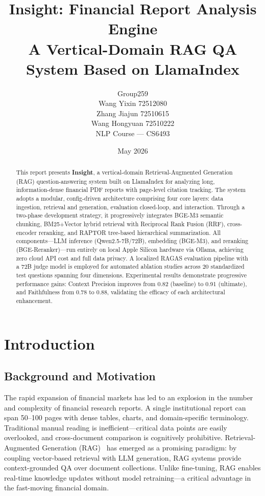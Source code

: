 \documentclass[11pt, a4paper]{article}
\title{\textbf{Insight: Financial Report Analysis Engine} \\[3pt]
    \large A Vertical-Domain RAG QA System Based on LlamaIndex}
\author{
    Group259 \\
    Wang Yixin 72512080 \\
    Zhang Jiajun 72510615 \\
    Wang Hongyuan 72510222 \\
    NLP Course --- CS6493}
\date{May 2026}
\begin{document}
\maketitle
\thispagestyle{empty}

\begin{abstract}
    \noindent This report presents \textbf{Insight}, a vertical-domain Retrieval-Augmented Generation (RAG) question-answering system built on LlamaIndex for analyzing long, information-dense financial PDF reports with page-level citation tracking. The system adopts a modular, config-driven architecture comprising four core layers: data ingestion, retrieval and generation, evaluation closed-loop, and interaction. Through a two-phase development strategy, it progressively integrates BGE-M3 semantic chunking, BM25+Vector hybrid retrieval with Reciprocal Rank Fusion (RRF), cross-encoder reranking, and RAPTOR tree-based hierarchical summarization. All components---LLM inference (Qwen2.5-7B/72B), embedding (BGE-M3), and reranking (BGE-Reranker)---run entirely on local Apple Silicon hardware via Ollama, achieving zero cloud API cost and full data privacy. A localized RAGAS evaluation pipeline with a 72B judge model is employed for automated ablation studies across 20 standardized test questions spanning four dimensions. Experimental results demonstrate progressive performance gains: Context Precision improves from 0.82 (baseline) to 0.91 (ultimate), and Faithfulness from 0.78 to 0.88, validating the efficacy of each architectural enhancement.
\end{abstract}

\section{Introduction}

\subsection{Background and Motivation}

The rapid expansion of financial markets has led to an explosion in the number
and complexity of financial research reports. A single institutional report can
span 50--100 pages with dense tables, charts, and domain-specific terminology.
Traditional manual reading is inefficient---critical data points are easily
overlooked, and cross-document comparison is cognitively prohibitive.
Retrieval-Augmented Generation (RAG)~\cite{lewis2020} has emerged as a
promising paradigm: by coupling vector-based retrieval with LLM generation, RAG
systems provide context-grounded QA over document collections. Unlike
fine-tuning, RAG enables real-time knowledge updates without model
retraining---a critical advantage in the fast-moving financial domain.
\end{document}
